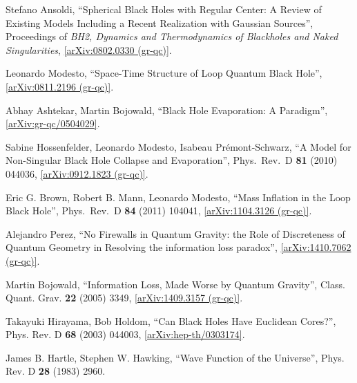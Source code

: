 \documentclass[12pt]{article}
\newcommand{\2}{$^2$}
\newcommand{\3}{$^3$}
\newcommand{\4}{$_4$}
\newcommand{\5}{$_5$}
\begin{document}
\begin{thebibliography}{400}
Stefano Ansoldi, 
``Spherical Black Holes with Regular Center: A Review of Existing Models Including a Recent Realization with Gaussian Sources'', Proceedings of \emph{BH2, Dynamics and Thermodynamics of Blackholes and Naked Singularities}, 
\href{http://arxiv.org/abs/0802.0330}{[arXiv:0802.0330 (gr-qc)]}.

 Leonardo Modesto,
  ``Space-Time Structure of Loop Quantum Black Hole'', \href{http://arxiv.org/abs/0811.2196}{[arXiv:0811.2196 (gr-qc)]}.
	
Abhay Ashtekar, Martin Bojowald, ``Black Hole Evaporation: A Paradigm'', \href{http://arxiv.org/abs/gr-qc/0504029v2}{[arXiv:gr-qc/0504029]}.


 Sabine Hossenfelder, Leonardo Modesto, Isabeau Pr\'emont-Schwarz,
  ``A Model for Non-Singular Black Hole Collapse and Evaporation'',
  Phys.\ Rev.\ D {\bf 81} (2010) 044036, \href{http://arxiv.org/abs/0912.1823}{[arXiv:0912.1823 (gr-qc)]}.

Eric G. Brown, Robert B. Mann, Leonardo Modesto,
  ``Mass Inflation in the Loop Black Hole'',
  Phys.\ Rev.\ D {\bf 84} (2011) 104041,
	\href{http://arxiv.org/abs/1104.3126}{[arXiv:1104.3126 (gr-qc)]}.
	
Alejandro Perez, ``No Firewalls in Quantum Gravity: the Role of Discreteness of Quantum Geometry in Resolving the information loss paradox'', \href{http://arxiv.org/abs/1410.7062v1}{[arXiv:1410.7062 (gr-qc)]}.

Martin Bojowald, ``Information Loss, Made Worse by Quantum Gravity'', Class. Quant. Grav. \textbf{22} (2005) 3349, \href{http://arxiv.org/abs/1409.3157}{[arXiv:1409.3157 (gr-qc)]}.

Takayuki Hirayama, Bob Holdom, ``Can Black Holes Have Euclidean Cores?'', Phys. Rev. D \textbf{68} (2003) 044003, \href{http://arxiv.org/abs/hep-th/0303174}{[arXiv:hep-th/0303174]}.


James B. Hartle, Stephen W. Hawking, ``Wave Function of the Universe'', Phys. Rev. D \textbf{28} (1983) 2960.
		

\end{thebibliography}
\end{document}
